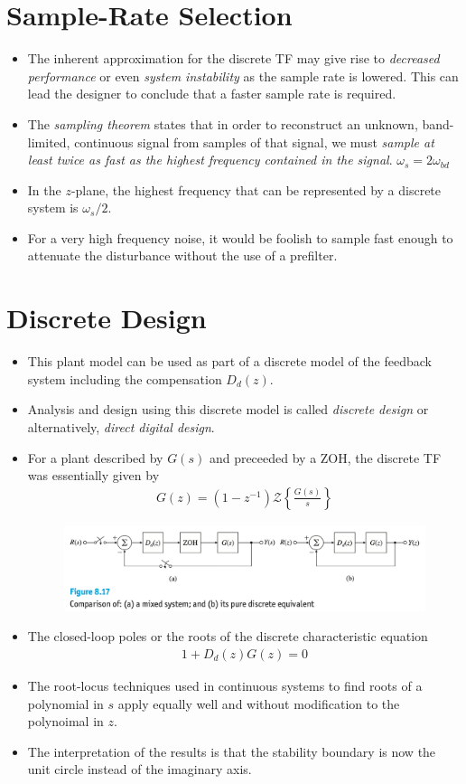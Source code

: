 \section{Sample-Rate Selection}
%
\begin{itemize}
	\item The inherent approximation for the discrete TF may give rise to \emph{decreased performance} or even \emph{system instability} as the sample rate is lowered. This can lead the designer to conclude that a faster sample rate is required. 
	\item The \emph{sampling theorem} states that in order to reconstruct an unknown, band-limited, continuous signal from samples of that signal, we must \emph{sample at least twice as fast as the highest frequency contained in the signal}. $\omega_s = 2 \omega_{bd}$  
	\item In the $z$-plane, the highest frequency that can be represented by a discrete system is $\omega_s/2$. 
	\item For a very high frequency noise, it would be foolish to sample fast enough to attenuate the disturbance without the use of a prefilter. 
\end{itemize}
%
%
\newpage
%
\section{Discrete Design} 
%
\begin{itemize}
	\item This plant model can be used as part of a discrete model of the feedback system including the compensation $D_d(z)$. 
	\item Analysis and design using this discrete model is called \emph{discrete design} or alternatively, \emph{direct digital design}. 
	\item For a plant described by $G(s)$ and preceeded by a ZOH, the discrete TF was essentially given by 
	\begin{align*}
		G(z) = (1-z^{-1}) \mathcal{Z} \left\{ \frac{G(s)}{s} \right\}
	\end{align*}
	\begin{figure}[h]
		\includegraphics[width=12cm]{./FIG_Franklin/fig8-17.png}
	\end{figure}
	\item The closed-loop poles or the roots of the discrete characteristic equation
	\begin{align*}
		1+ D_d(z) G(z) = 0 
	\end{align*}
	\item The root-locus techniques used in continuous systems to find roots of a polynomial in $s$ apply equally well and without modification to the polynoimal in $z$.
	\item The interpretation of the results is that the stability boundary is now the unit circle instead of the imaginary axis. 
%
\end{itemize}
%

